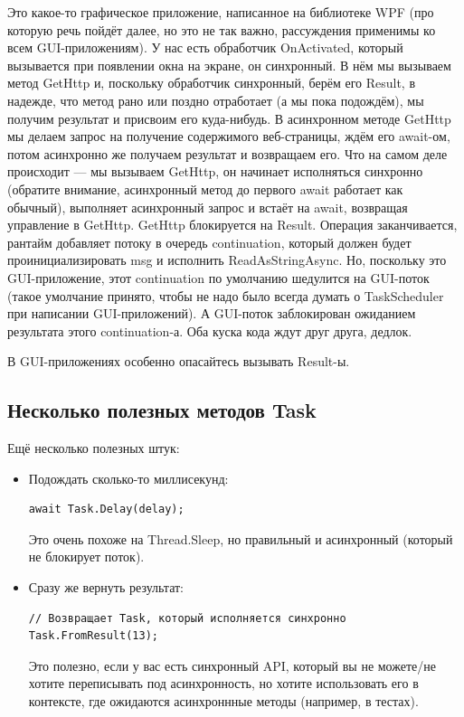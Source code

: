 \documentclass[a5paper]{article}
\begin{document}
Это какое-то графическое приложение, написанное на библиотеке WPF (про которую речь пойдёт далее, но это не так важно, рассуждения применимы ко всем GUI-приложениям). У нас есть обработчик OnActivated, который вызывается при появлении окна на экране, он синхронный. В нём мы вызываем метод GetHttp и, поскольку обработчик синхронный, берём его Result, в надежде, что метод рано или поздно отработает (а мы пока подождём), мы получим результат и присвоим его куда-нибудь. В асинхронном методе GetHttp мы делаем запрос на получение содержимого веб-страницы, ждём его await-ом, потом асинхронно же получаем результат и возвращаем его. Что на самом деле происходит --- мы вызываем GetHttp, он начинает исполняться синхронно (обратите внимание, асинхронный метод до первого await работает как обычный), выполняет асинхронный запрос и встаёт на await, возвращая управление в GetHttp. GetHttp блокируется на Result. Операция заканчивается, рантайм добавляет потоку в очередь continuation, который должен будет проинициализировать msg и исполнить ReadAsStringAsync. Но, поскольку это GUI-приложение, этот continuation по умолчанию шедулится на GUI-поток (такое умолчание принято, чтобы не надо было всегда думать о TaskScheduler при написании GUI-приложений). А GUI-поток заблокирован ожиданием результата этого continuation-а. Оба куска кода ждут друг друга, дедлок. 

В GUI-приложениях особенно опасайтесь вызывать Result-ы.

\subsection{Несколько полезных методов Task}

Ещё несколько полезных штук:

\begin{itemize}
    \item Подождать сколько-то миллисекунд:
    \begin{verbatim}
await Task.Delay(delay);
    \end{verbatim}
    Это очень похоже на Thread.Sleep, но правильный и асинхронный (который не блокирует поток).

    \item Сразу же вернуть результат:
    \begin{verbatim}
// Возвращает Task, который исполняется синхронно
Task.FromResult(13);
    \end{verbatim}
    Это полезно, если у вас есть синхронный API, который вы не можете/не хотите переписывать под  асинхронность, но хотите использовать его в контексте, где ожидаются асинхроннные методы (например, в тестах).
\end{itemize}
\end{document}
